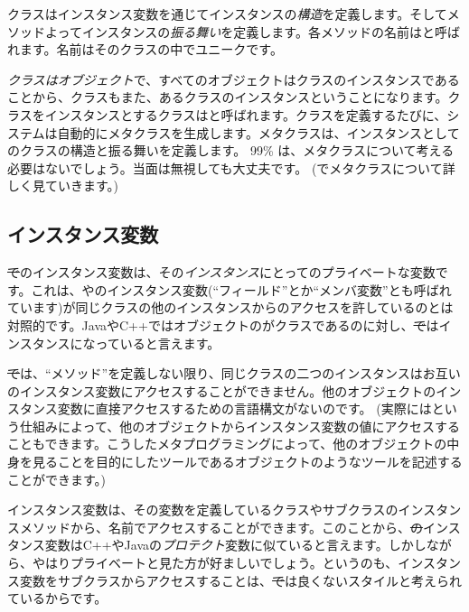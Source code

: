 \documentclass[a4paper,10pt,twoside]{book}
\begin{document}
クラスはインスタンス変数を通じてインスタンスの\emph{構造}を定義します。そしてメソッドよってインスタンスの\emph{振る舞い}を定義します。各メソッドの名前はと呼ばれます。名前はそのクラスの中でユニークです。

\emph{クラスはオブジェクト}で、{すべてのオブジェクトはクラスのインスタンスである}ことから、クラスもまた、あるクラスのインスタンスということになります。クラスをインスタンスとするクラスはと呼ばれます。クラスを定義するたびに、システムは自動的にメタクラスを生成します。メタクラスは、インスタンスとしてのクラスの構造と振る舞いを定義します。
99\% は、メタクラスについて考える必要はないでしょう。当面は無視しても大丈夫です。
(でメタクラスについて詳しく見ていきます。)
\subsection{インスタンス変数}

\st でのインスタンス変数は、その\emph{インスタンス}にとってのプライベートな変数です。これは、やのインスタンス変数(``フィールド''とか``メンバ変数''とも呼ばれています)が同じクラスの他のインスタンスからのアクセスを許しているのとは対照的です。JavaやC++ではオブジェクトのがクラスであるのに対し、\st ではインスタンスになっていると言えます。


\st では、``メソッド''を定義しない限り、同じクラスの二つのインスタンスはお互いのインスタンス変数にアクセスすることができません。他のオブジェクトのインスタンス変数に直接アクセスするための言語構文がないのです。
(実際にはという仕組みによって、他のオブジェクトからインスタンス変数の値にアクセスすることもできます。こうしたメタプログラミングによって、他のオブジェクトの中身を見ることを目的にしたツールであるオブジェクトのようなツールを記述することができます。)

インスタンス変数は、その変数を定義しているクラスやサブクラスのインスタンスメソッドから、名前でアクセスすることができます。このことから、\st のインスタンス変数はC++やJavaの\emph{プロテクト}変数に似ていると言えます。しかしながら、やはりプライベートと見た方が好ましいでしょう。というのも、インスタンス変数をサブクラスからアクセスすることは、\st では良くないスタイルと考えられているからです。
\end{document}
